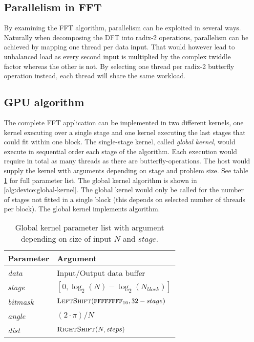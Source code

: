 \subsection{Parallelism in FFT}

By examining the \gls{FFT} algorithm, parallelism can be exploited in several ways. Naturally when decomposing the \gls{DFT} into radix-2 operations, parallelism can be achieved by mapping one thread per data input. That would however lead to unbalanced load as every second input is multiplied by the complex twiddle factor whereas the other is not. By selecting one thread per radix-2 butterfly operation instead, each thread will share the same workload.

\subsection{GPU algorithm}

The complete \gls{FFT} application can be implemented in two different kernels, one kernel executing over a single stage and one kernel executing the last stages that could fit within one block. The single-stage kernel, called \emph{global kernel}, would execute in sequential order each stage of the algorithm. Each execution would require in total as many threads as there are butterfly-operations. The host would supply the kernel with arguments depending on stage and problem size. See table \ref{tab:global-kernel} for full parameter list. The global kernel algorithm is shown in \ref{alg:device:global-kernel}. The global kernel would only be called for the number of stages not fitted in a single block (this depends on selected number of threads per block). The global kernel implements {\CTALG} algorithm.

\begin{table}
	\centering
	\begin{tabular}{|l|l|}
		\hline
		Parameter & Argument \\ \hline
		\textit{data} & Input/Output data buffer \\ \hline
		\textit{stage} & $[0,\log_{2}(N) - \log_{2}(N_{block})]$ \\ \hline
		\textit{bitmask} & $\Call{LeftShift}{\texttt{FFFFFFFF}_{16}, 32 - stage}$ \\ \hline
		\textit{angle} & $(2 \cdot \pi)/N$ \\ \hline
		\textit{dist} & $\Call{RightShift}{N, steps}$ \\ \hline		
	\end{tabular}
	\caption{Global kernel parameter list with argument depending on size of input $N$ and $stage$.}
	\label{tab:global-kernel}
\end{table}

